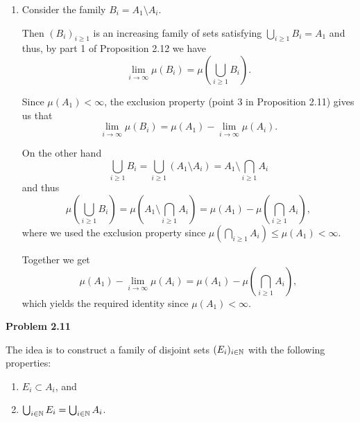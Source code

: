 \begin{enumerate}[label=(\alph*)]
Thus,
\[
	\lim_{i \to \infty} \mu(A_i) = \sum_{k = 1}^\infty \mu(E_k) = \mu\left(\bigcup_{i \ge 1} A_i\right),
\]
as required.
\item {}

Consider the family $B_i = A_1 \setminus A_i$. 

Then $(B_i)_{i \ge 1}$ is an increasing family of sets satisfying $\bigcup_{i \ge 1} B_i = A_1$ and thus, by part 1 of Proposition 2.12 we have
\[
	\lim_{i \to \infty} \mu(B_i) = \mu\left(\bigcup_{i \ge 1} B_i\right).
\]

Since $\mu(A_1) < \infty$, the exclusion property (point 3 in Proposition 2.11) gives us that
\[
	\lim_{i \to \infty} \mu(B_i) = \mu(A_1) - \lim_{i \to \infty} \mu(A_i). 
\]

On the other hand
\[
	\bigcup_{i \ge 1} B_i = \bigcup_{i \ge 1} (A_1 \setminus A_i) = A_1 \setminus \bigcap_{i \ge 1} A_i
\]
and thus
\[
	\mu\left(\bigcup_{i \ge 1} B_i\right) = \mu\left(A_1 \setminus \bigcap_{i \ge 1} A_i\right)
	= \mu(A_1) - \mu\left(\bigcap_{i \ge 1} A_i\right),
\]
where we used the exclusion property since $ \mu\left(\bigcap_{i \ge 1} A_i\right) \le \mu(A_1) < \infty$.

Together we get
\[
	\mu(A_1) - \lim_{i \to \infty} \mu(A_i) = \mu(A_1) - \mu\left(\bigcap_{i \ge 1} A_i\right),
\]
which yields the required identity since $\mu(A_1) < \infty$.

\end{enumerate}

\bigskip

\textbf{Problem 2.11}

The idea is to construct a family of disjoint sets $(E_i)_{i \in \mathbb N}$ with the following properties:
\begin{enumerate}
\item $E_i \subset A_i$, and
\item $\bigcup_{i \in \mathbb N} E_i = \bigcup_{i \in \mathbb N} A_i$.
\end{enumerate}

